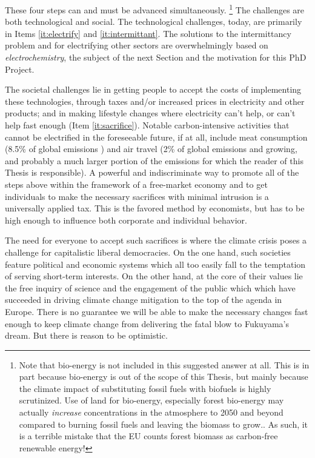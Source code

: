 These four steps can and must be advanced simultaneously.
\footnote{Note that bio-energy is not included in this suggested answer at all. This is in part because bio-energy is out of the scope of this Thesis, but mainly because the climate impact of substituting fossil fuels with biofuels is highly scrutinized. Use of land for bio-energy, especially forest bio-energy may actually \textit{increase}  concentrations in the atmosphere to 2050 and beyond compared to burning fossil fuels and leaving the biomass to grow.\cite{Searchinger2018, Bentsen2017}. As such, it is a terrible mistake that the EU counts forest biomass as carbon-free renewable energy!}
The challenges are both technological and social. The technological challenges, today, are primarily in Items \ref{it:electrify} and \ref{it:intermittant}. The solutions to the intermittancy problem and for electrifying other sectors are overwhelmingly based on \textit{electrochemistry}, the subject of the next Section and the motivation for this PhD Project.

The societal challenges lie in getting people to accept the costs of implementing these technologies, through taxes and/or increased prices in electricity and other products; and in making lifestyle changes where electricity can't help, or can't help fast enough (Item \ref{it:sacrifice}). Notable carbon-intensive activities that cannot be electrified in the foreseeable future, if at all, include meat consumption (8.5\% of global emissions \cite{Caro2017}) and air travel (2\% of global emissions and growing\cite{CarbonBrief_aviation}, and probably a much larger portion of the emissions for which the reader of this Thesis is responsible). A powerful and indiscriminate way to promote all of the steps above within the framework of a free-market economy and to get individuals to make the necessary sacrifices with minimal intrusion is a universally applied  tax. This is the favored method by economists\cite{CarbonTax_Economist}, but has to be high enough to influence both corporate and individual behavior.

The need for everyone to accept such sacrifices is where the climate crisis poses a challenge for capitalistic liberal democracies. On the one hand, such societies feature political and economic systems which all too easily fall to the temptation of serving short-term interests. On the other hand, at the core of their values lie the free inquiry of science and the engagement of the public which which have succeeded in driving climate change mitigation to the top of the agenda in Europe. There is no guarantee we will be able to make the necessary changes fast enough to keep climate change from delivering the fatal blow to Fukuyama's dream. But there is reason to be optimistic.


